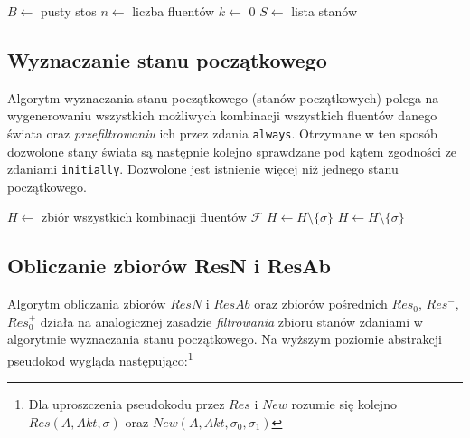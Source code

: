 \documentclass{article}
\begin{document}
\begin{algorithm}[H]
\begin{algorithmic}
\State $B \gets $ pusty stos
\State $n \gets $ liczba fluentów
\State $k \gets $ 0
\State $S \gets $ lista stanów
    \EndIf
	\State {}
	\State {}
	\State {}
	\State {}
	\State {}
	\State {}
	\State {}
\EndFunction
\end{algorithmic}
\end{algorithm}

\newpage
\subsection{Wyznaczanie stanu początkowego}

Algorytm wyznaczania stanu początkowego (stanów początkowych) polega na wygenerowaniu wszystkich możliwych kombinacji wszystkich fluentów danego świata oraz \textit{przefiltrowaniu} ich przez zdania \texttt{always}. Otrzymane w ten sposób dozwolone stany świata są następnie kolejno sprawdzane pod kątem zgodności ze zdaniami \texttt{initially}. Dozwolone jest istnienie więcej niż jednego stanu początkowego.

\begin{algorithm}[H]
\begin{algorithmic}
\State $H \gets $ zbiór wszystkich kombinacji fluentów $\mathcal{F}$
		\If{$\sigma \nvDash \alpha$}
			\State $H \gets H \setminus \{\sigma\}$
		\EndIf
	\EndFor
\EndFor
{}
		\If{$\sigma \nvDash \alpha$}
			\State $H \gets H \setminus \{\sigma\}$
		\EndIf
	\EndFor
\EndFor
\end{algorithmic}
\end{algorithm}

\newpage
\subsection{Obliczanie zbiorów ResN i ResAb}

Algorytm obliczania zbiorów $ResN$ i $ResAb$ oraz zbiorów pośrednich $Res_0$, $Res^{-}$, $Res^{+}_{0}$ działa na analogicznej zasadzie \textit{filtrowania} zbioru stanów zdaniami w algorytmie wyznaczania stanu początkowego. Na wyższym poziomie abstrakcji pseudokod wygląda następująco:\footnote{Dla uproszczenia pseudokodu przez $Res$ i $New$ rozumie się kolejno $Res(A,Akt,\sigma)$ oraz $New(A,Akt,\sigma_0,\sigma_1)$}
\end{document}
